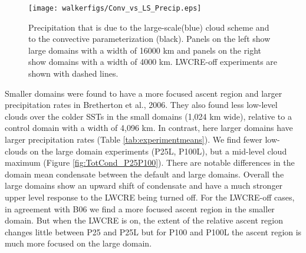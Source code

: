 \documentclass[draft]{agujournal2019}
\begin{document}
{%
\begin{figure}
  \centering
      \texttt{[image: walkerfigs/Conv\_vs\_LS\_Precip.eps]}
  \caption{Precipitation that is due to the large-scale(blue) cloud scheme and to the convective 
  parameterization (black).  
  Panels on the left show large domains with a width of 16000 km and
  panels on the right show domains with a width of 4000 km.  LWCRE-off experiments are shown with dashed lines.  }
  \label{fig:conv_vs_ls}
\end{figure}

Smaller domains were found to have a more focused ascent region and larger precipitation rates in Bretherton et al., 2006.
They also found less low-level clouds over the colder SSTs in the small domains (1,024 km wide), relative 
to a control domain with a width of 4,096 km.   In contrast, here larger domains have larger precipitation 
rates (Table \ref{tab:experimentmeans}).  
We find fewer low-clouds on the large domain experiments (P25L, P100L), but a mid-level cloud 
maximum (Figure \ref{fig:TotCond_P25P100}).   There are notable differences in the domain mean condensate between 
the default and large domains.  Overall the large domains show an upward shift of condensate and have 
a much stronger upper level response to the LWCRE being turned off.
For the LWCRE-off cases, in agreement with B06 we find a more 
focused ascent region in the smaller domain.   But when the LWCRE is on, the extent of the relative ascent region 
changes little between P25 
and P25L but for P100 and P100L the ascent region is much more focused on the large domain.    



}
\end{document}
